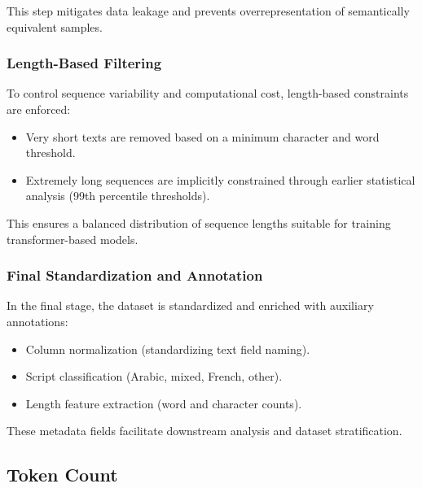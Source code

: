 \documentclass[12pt,a4paper]{report}
\begin{document}
This step mitigates data leakage and prevents overrepresentation of semantically equivalent samples.


\subsubsection{Length-Based Filtering}

To control sequence variability and computational cost, length-based constraints are enforced:

\begin{itemize}
    \item Very short texts are removed based on a minimum character and word threshold.
    \item Extremely long sequences are implicitly constrained through earlier statistical analysis (99th percentile thresholds).
\end{itemize}

This ensures a balanced distribution of sequence lengths suitable for training transformer-based models.


\subsubsection{Final Standardization and Annotation}

In the final stage, the dataset is standardized and enriched with auxiliary annotations:

\begin{itemize}
    \item Column normalization (standardizing text field naming).
    \item Script classification (Arabic, mixed, French, other).
    \item Length feature extraction (word and character counts).
\end{itemize}

These metadata fields facilitate downstream analysis and dataset stratification.

\subsection{Token Count}
\end{document}

